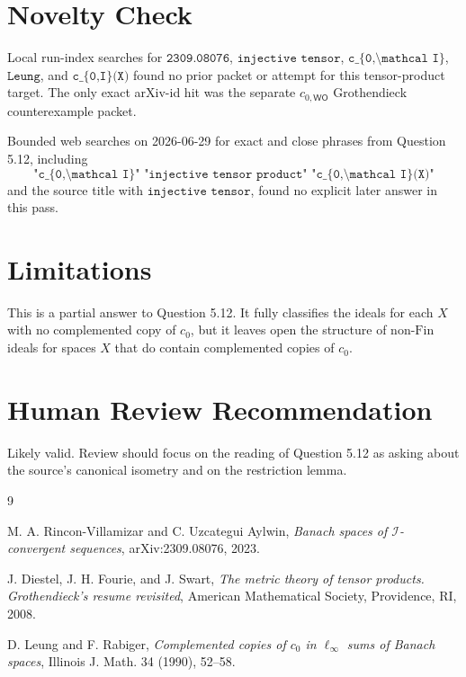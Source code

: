 \documentclass[11pt]{article}
\newcommand{\Fin}{\mathrm{Fin}}
\newcommand{\WO}{\mathsf{WO}}
\begin{document}
\section*{Novelty Check}

Local run-index searches for \(\texttt{2309.08076}\),
\(\texttt{injective tensor}\), \(\texttt{c\_\{0,\textbackslash mathcal I\}}\),
\(\texttt{Leung}\), and \(\texttt{c\_\{0,I\}(X)}\) found no prior packet or
attempt for this tensor-product target.  The only exact arXiv-id hit was the
separate \(c_{0,\WO}\) Grothendieck counterexample packet.

Bounded web searches on 2026-06-29 for exact and close phrases from Question
5.12, including
\[
\texttt{"c\_\{0,\textbackslash mathcal I\}" "injective tensor product"
"c\_\{0,\textbackslash mathcal I\}(X)"}
\]
and the source title with \(\texttt{injective tensor}\), found no explicit
later answer in this pass.

\section*{Limitations}

This is a partial answer to Question 5.12.  It fully classifies the ideals for
each \(X\) with no complemented copy of \(c_0\), but it leaves open the
structure of non-\(\Fin\) ideals for spaces \(X\) that do contain complemented
copies of \(c_0\).

\section*{Human Review Recommendation}

Likely valid.  Review should focus on the reading of Question 5.12 as asking
about the source's canonical isometry and on the restriction lemma.

\begin{thebibliography}{9}

M. A. Rincon-Villamizar and C. Uzcategui Aylwin,
\emph{Banach spaces of \(\mathcal I\)-convergent sequences},
arXiv:2309.08076, 2023.

J. Diestel, J. H. Fourie, and J. Swart,
\emph{The metric theory of tensor products. Grothendieck's resume revisited},
American Mathematical Society, Providence, RI, 2008.

D. Leung and F. Rabiger,
\emph{Complemented copies of \(c_0\) in \(\ell_\infty\) sums of Banach spaces},
Illinois J. Math. 34 (1990), 52--58.

\end{thebibliography}
\end{document}
